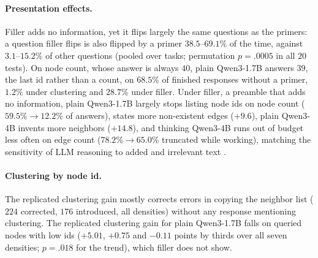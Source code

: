 \documentclass[11pt]{article}
\begin{document}
\paragraph{Presentation effects.} Filler adds no information, yet it flips largely the same questions as the primers: a question filler flips is also flipped by a primer $38.5$--$69.1\%$ of the time, against $3.1$--$15.2\%$ of other questions (pooled over tasks; permutation $p=.0005$ in all $20$ tests). %
On node count, whose answer is always $40$, plain Qwen3-1.7B answers $39$, the last id rather than a count, on $68.5\%$ of finished responses without a primer, $1.2\%$ under clustering and $28.7\%$ under filler. %
Under filler, a preamble that adds no information, plain Qwen3-1.7B largely stops listing node ids on node count ($59.5\%\to12.2\%$ of answers), %
states more non-existent edges ($+9.6$), %
plain Qwen3-4B invents more neighbors ($+14.8$), %
and thinking Qwen3-4B runs out of budget less often on edge count ($78.2\%\to65.0\%$ truncated while working), %
matching the sensitivity of LLM reasoning to added and irrelevant text \citep{levy2024sametask,shi2023distracted}.

\paragraph{Clustering by node id.} The replicated clustering gain mostly corrects errors in copying the neighbor list ($224$ corrected, $176$ introduced, all densities) without any response mentioning clustering. %
The replicated clustering gain for plain Qwen3-1.7B falls on queried nodes with low ids ($+5.01$, $+0.75$ and $-0.11$ points by thirds over all seven densities; $p=.018$ for the trend), which filler does not show. %
\end{document}
